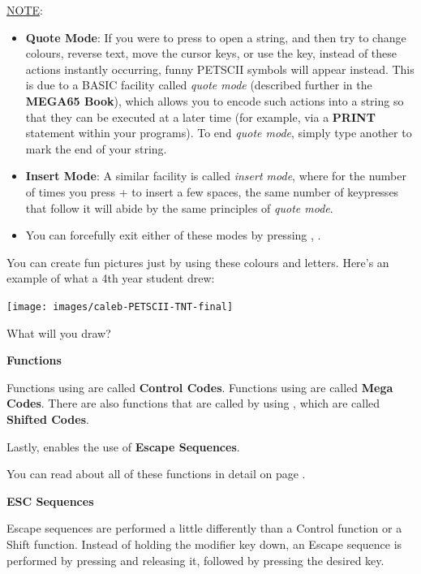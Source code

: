 \underline{NOTE}:
\begin{itemize}
  \item {\bf Quote Mode}: If you were to press  to open a string, and then try to change
colours, reverse text, move the cursor keys, or use the  key, instead
of these actions instantly occurring, funny PETSCII symbols will appear instead. This is
due to a BASIC facility called {\it quote mode} (described further in the \textbf{MEGA65 Book}),
which allows you to encode such actions into a string so that they can be executed at a later
time (for example, via a {\bf PRINT} statement within your programs). To end {\it quote mode}, simply
type another  to mark the end of your string.
  \item {\bf Insert Mode}: A similar facility is called
{\it insert mode}, where for the number of times you press  + 
to insert a few spaces, the same number of keypresses that follow it will abide by the same
principles of {\it quote mode}.
  \item You can forcefully exit either of these modes by pressing , .
\end{itemize}

\needspace{4cm}
You can create fun pictures just by using these colours and letters. Here's an example of what a 4th year student drew:

\begin{center}
\texttt{[image: images/caleb-PETSCII-TNT-final]}
\end{center}

What will you draw?

\needspace{2cm}
\textbf{Functions}

Functions using  are called \textbf{Control Codes}.
Functions using \megasymbolkey are called \textbf{Mega Codes}. There are also functions that are called by using , which are called \textbf{Shifted Codes}.

Lastly,  enables the use of \textbf{Escape Sequences}.

You can read about all of these functions in detail on page \pageref{appendix:controlcodes}.

\needspace{2cm}
\textbf{ESC Sequences}

Escape sequences are performed a little differently than a Control function or a Shift function. Instead of holding the modifier key down, an Escape sequence is performed by pressing  and releasing it, followed by pressing the desired key.

